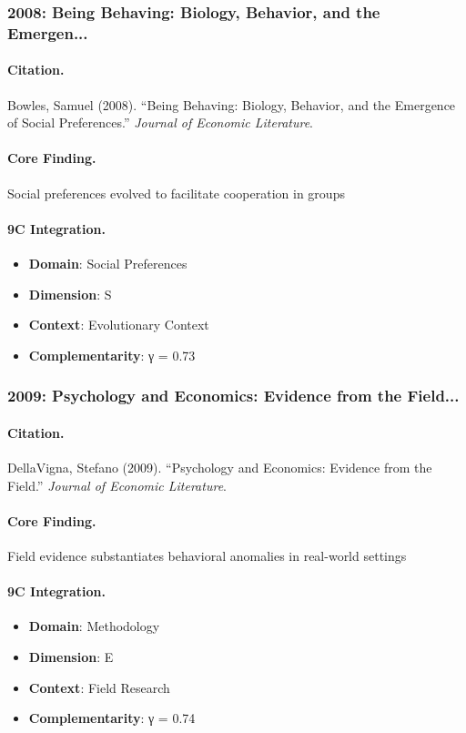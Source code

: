 \subsubsection{2008: Being Behaving: Biology, Behavior, and the Emergen...}

\paragraph{Citation.}
Bowles, Samuel (2008). ``Being Behaving: Biology, Behavior, and the Emergence of Social Preferences.''
\textit{Journal of Economic Literature}.

\paragraph{Core Finding.}
Social preferences evolved to facilitate cooperation in groups

\paragraph{9C Integration.}
\begin{itemize}[nosep]
  \item \textbf{Domain}: Social Preferences
  \item \textbf{Dimension}: S
  \item \textbf{Context}: Evolutionary Context
  \item \textbf{Complementarity}: γ = 0.73
\end{itemize}

\subsubsection{2009: Psychology and Economics: Evidence from the Field...}

\paragraph{Citation.}
DellaVigna, Stefano (2009). ``Psychology and Economics: Evidence from the Field.''
\textit{Journal of Economic Literature}.

\paragraph{Core Finding.}
Field evidence substantiates behavioral anomalies in real-world settings

\paragraph{9C Integration.}
\begin{itemize}[nosep]
  \item \textbf{Domain}: Methodology
  \item \textbf{Dimension}: E
  \item \textbf{Context}: Field Research
  \item \textbf{Complementarity}: γ = 0.74
\end{itemize}

